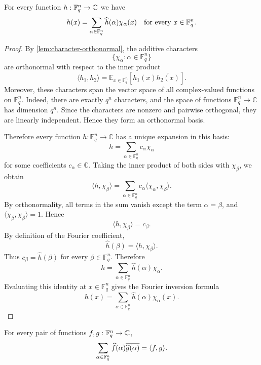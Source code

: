 \begin{lemma}
\label{lem:fourier-inversion}
\leanok
For every function $h:{\mathbb F}_q^n\to{\mathbb C}$ we have
\[
    h(x)=\sum_{\alpha\in{\mathbb F}_q^n}\widehat h(\alpha)\chi_\alpha(x)
    \quad\text{for every }x\in{\mathbb F}_q^n.
\]
\end{lemma}

\begin{proof}\leanok
By \cref{lem:character-orthonormal}, the additive characters
\[
    \{\chi_\alpha : \alpha \in \mathbb F_q^n\}
\]
are orthonormal with respect to the inner product
\[
    \langle h_1,h_2\rangle
    =
    \mathbb E_{x\in \mathbb F_q^n}
    \left[h_1(x)\overline{h_2(x)}\right].
\]
Moreover, these characters span the vector space of all complex-valued
functions on \(\mathbb F_q^n\). Indeed, there are exactly \(q^n\) characters,
and the space of functions \(\mathbb F_q^n\to\mathbb C\) has dimension \(q^n\).
Since the characters are nonzero and pairwise orthogonal, they are linearly
independent. Hence they form an orthonormal basis.

Therefore every function \(h:\mathbb F_q^n\to\mathbb C\) has a unique expansion
in this basis:
\[
    h
    =
    \sum_{\alpha\in\mathbb F_q^n}
        c_\alpha \chi_\alpha
\]
for some coefficients \(c_\alpha\in\mathbb C\). Taking the inner product of
both sides with \(\chi_\beta\), we obtain
\[
    \langle h,\chi_\beta\rangle
    =
    \sum_{\alpha\in\mathbb F_q^n}
        c_\alpha \langle \chi_\alpha,\chi_\beta\rangle .
\]
By orthonormality, all terms in the sum vanish except the term
\(\alpha=\beta\), and \(\langle \chi_\beta,\chi_\beta\rangle=1\). Hence
\[
    \langle h,\chi_\beta\rangle = c_\beta .
\]
By definition of the Fourier coefficient,
\[
    \widehat h(\beta)=\langle h,\chi_\beta\rangle .
\]
Thus \(c_\beta=\widehat h(\beta)\) for every
\(\beta\in\mathbb F_q^n\). Therefore
\[
    h
    =
    \sum_{\alpha\in\mathbb F_q^n}
        \widehat h(\alpha)\chi_\alpha .
\]
Evaluating this identity at \(x\in\mathbb F_q^n\) gives the Fourier inversion
formula
\[
    h(x)
    =
    \sum_{\alpha\in\mathbb F_q^n}
        \widehat h(\alpha)\chi_\alpha(x).
\]
\end{proof}

\begin{lemma}
\label{lem:fourier-plancherel}
\leanok
For every pair of functions $f,g:{\mathbb F}_q^n\to{\mathbb C}$,
\[
    \sum_{\alpha\in{\mathbb F}_q^n}
        \widehat f(\alpha)\overline{\widehat g(\alpha)}
    =
    \langle f, g \rangle.
\]
\end{lemma}

